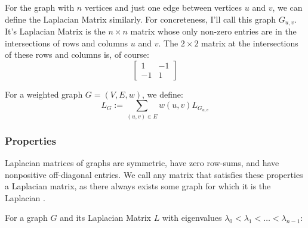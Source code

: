 For the graph with $n$ vertices and just one edge between vertices $u$ and $v$, 
we can define the Laplacian Matrix similarly. For concreteness, I'll call this
graph $G_{u,v}$. It's Laplacian Matrix is the $n{\times}n$ matrix whose only 
non-zero entries are in the intersections of rows and columns $u$ and $v$. The 
$2{\times}2$ matrix at the intersections of these rows and columns is, of 
course:
\begin{equation}
    \begin{bmatrix}
        1 & -1 \\
        -1 & 1
    \end{bmatrix}
\end{equation}

For a weighted graph $G = (V,E,w)$, we define:
\begin{equation}
L_{G} := \sum_{(u,v) \in E} w(u,v)L_{G_{u,v}}
\end{equation}

\subsubsection{Properties}
Laplacian matrices of graphs are symmetric, have zero row-sums, and have 
nonpositive off-diagonal entries. We call any matrix that satisfies these 
properties a Laplacian matrix, as there always exists some graph for which it is
the Laplacian \cite{Spielman:2010}.

For a graph $G$ and its Laplacian Matrix $L$ with eigenvalues $\lambda_{0} < 
\lambda_{1} < \ldots < \lambda_{n-1}$:

